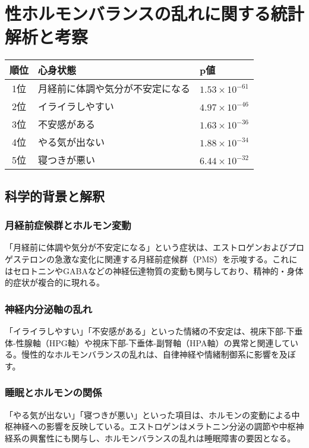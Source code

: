 \documentclass[a4paper,12pt]{article}
\begin{document}
\section{性ホルモンバランスの乱れに関する統計解析と考察}

\begin{table}[h]
\centering
\begin{tabular}{|c|l|l|}
\hline
\textbf{順位} & \textbf{心身状態} & \textbf{p値} \\
\hline
1位 & 月経前に体調や気分が不安定になる & $1.53 \times 10^{-61}$ \\
2位 & イライラしやすい & $4.97 \times 10^{-46}$ \\
3位 & 不安感がある & $1.63 \times 10^{-36}$ \\
4位 & やる気が出ない & $1.88 \times 10^{-34}$ \\
5位 & 寝つきが悪い & $6.44 \times 10^{-32}$ \\
\hline
\end{tabular}
\end{table}

\subsection*{科学的背景と解釈}

\subsubsection*{月経前症候群とホルモン変動}
「月経前に体調や気分が不安定になる」という症状は、エストロゲンおよびプロゲステロンの急激な変化に関連する月経前症候群（PMS）を示唆する。これにはセロトニンやGABAなどの神経伝達物質の変動も関与しており、精神的・身体的症状が複合的に現れる。

\subsubsection*{神経内分泌軸の乱れ}
「イライラしやすい」「不安感がある」といった情緒の不安定は、視床下部-下垂体-性腺軸（HPG軸）や視床下部-下垂体-副腎軸（HPA軸）の異常と関連している。慢性的なホルモンバランスの乱れは、自律神経や情緒制御系に影響を及ぼす。

\subsubsection*{睡眠とホルモンの関係}
「やる気が出ない」「寝つきが悪い」といった項目は、ホルモンの変動による中枢神経への影響を反映している。エストロゲンはメラトニン分泌の調節や中枢神経系の興奮性にも関与し、ホルモンバランスの乱れは睡眠障害の要因となる。
\end{document}
